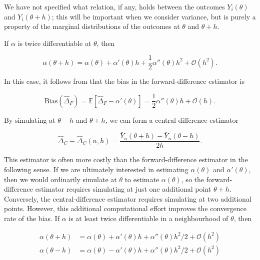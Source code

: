 We have not specified what relation, if any, holds between the outcomes $Y_i(\theta)$ and $Y_i(\theta+h)$; this will be important when we consider variance, but 
is purely a property of the marginal distributions of the outcomes at $\theta$ and $\theta+h$.

If $\alpha$ is twice differentiable at $\theta$, then

\begin{equation*}
	\alpha(\theta+h) = \alpha(\theta) + \alpha'(\theta)h + \frac{1}{2}\alpha''(\theta)h^2 + \mathcal{O}(h^2).
\end{equation*}

In this case, it follows from  that the bias in the forward-difference estimator is

\begin{equation}
	\text{Bias}(\hat{\Delta}_F) = \mathbb{E}[\hat{\Delta}_F - \alpha'(\theta)] = \frac{1}{2}\alpha''(\theta)h + \mathcal{O}(h).
	\label{eq:ForwardDiffBias}
\end{equation}

By simulating at $\theta - h$ and $\theta + h$, we can form a central-difference estimator

\begin{equation}
	\hat{\Delta}_C \equiv \hat{\Delta}_C (n,h) = \frac{\bar{Y}_n(\theta+h) - \bar{Y}_n(\theta-h)}{2h}.
	\label{eq:CentralDiffEstimator}
\end{equation}

This estimator is often more costly than the forward-difference estimator in the following sense. If we are ultimately interested in estimating $\alpha(\theta)$ and $\alpha'(\theta)$, then we would ordinarily simulate at $\theta$ to estimate $\alpha(\theta)$, so the forward-difference estimator requires simulating at just one additional point $\theta + h$. Conversely, the central-difference estimator requires simulating at two additional points. However, this additional computational effort improves the convergence rate of the bias. If $\alpha$ is at least twice differentiable in a neighbourhood of $\theta$, then

\begin{align*}
	\alpha(\theta + h) & = \alpha(\theta) + \alpha'(\theta) h +\alpha''(\theta)h^2/2 + \mathcal{O}(h^2) \\
	\alpha(\theta - h) & = \alpha(\theta) - \alpha'(\theta) h +\alpha''(\theta)h^2/2 + \mathcal{O}(h^2)
\end{align*}

